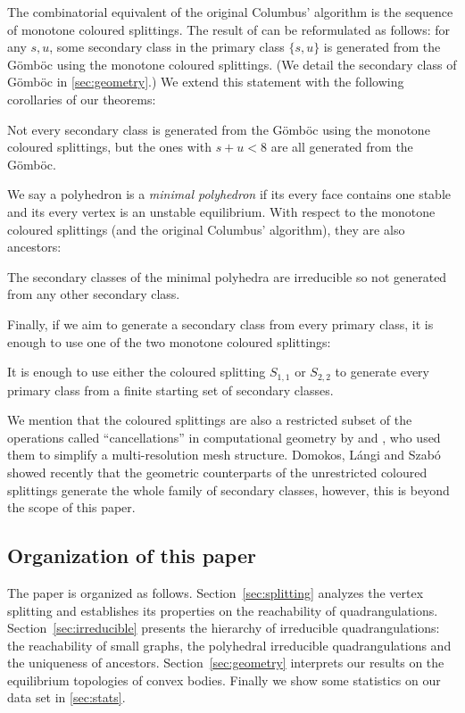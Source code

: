\documentclass[]{article}
\newcommand{\Gomboc}{Gömböc\xspace}
\begin{document}
The combinatorial equivalent of the original Columbus' algorithm is the sequence of monotone coloured splittings.
The result of \cite{Domokos2006} can be reformulated as follows: for any $s,u$, some secondary class in the primary class $\{s,u\}$ is generated from the \Gomboc using the monotone coloured splittings.
(We detail the secondary class of \Gomboc in \autoref{sec:geometry}.)
We extend this statement with the following corollaries of our theorems:
\begin{coro}
  \label{coro:irreduc}
  Not every secondary class is generated from the \Gomboc using the monotone coloured splittings, but the ones with $s+u<8$ are all generated from the \Gomboc.
\end{coro}
We say a polyhedron is a \emph{minimal polyhedron} if its every face contains one stable and its every vertex is an unstable equilibrium.
With respect to the monotone coloured splittings (and the original Columbus' algorithm), they are also ancestors:
\begin{coro}
  \label{coro:minpol}
  The secondary classes of the minimal polyhedra are irreducible so not generated from any other secondary class.
\end{coro}
Finally, if we aim to generate a secondary class from every primary class, it is enough to use one of the two monotone coloured splittings:
\begin{coro}
  \label{coro:restr}
  It is enough to use either the coloured splitting $S_{1,1}$ or $S_{2,2}$ to generate every primary class from a finite starting set of secondary classes.
\end{coro}


We mention that the coloured splittings are also a restricted subset of the operations called ``cancellations'' in computational geometry by \citet{Edelsbrunner2001} and \citet[Fig.~7.3]{Bremer2004}, who used them to simplify a multi-resolution mesh structure.
Domokos, Lángi and Szabó \cite{Domokos2012} showed recently that the geometric counterparts of the unrestricted coloured splittings generate the whole family of secondary classes, however, this is beyond the scope of this paper.


\subsection{Organization of this paper}

The paper is organized as follows.
Section~\ref*{sec:splitting} analyzes the vertex splitting and establishes its properties on the reachability of quadrangulations.
Section~\ref*{sec:irreducible} presents the hierarchy of irreducible quadrangulations: the reachability of small graphs, the polyhedral irreducible quadrangulations and the uniqueness of ancestors.
Section~\ref*{sec:geometry} interprets our results on the equilibrium topologies of convex bodies.
Finally we show some statistics on our data set in \autoref*{sec:stats}.
\end{document}
